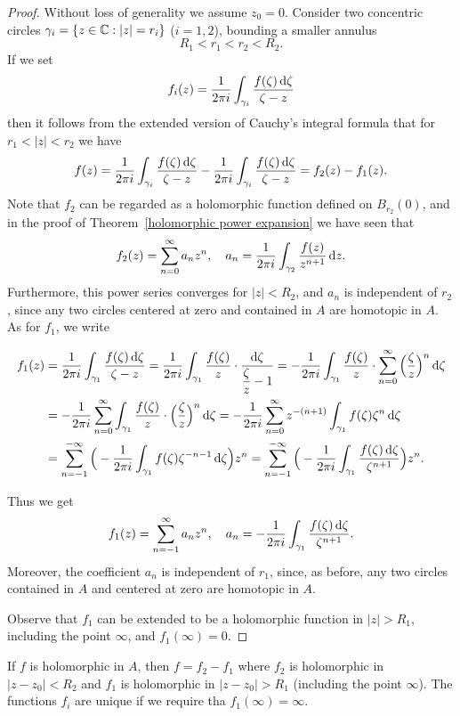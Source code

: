 \begin{proof}
Without loss of generality we assume $z_0=0$. Consider two concentric circles $\gamma_i=\{z\in\mathbb{C}:|z|=r_i\}$ ($i=1,2$), bounding a smaller annulus
\[R_1<r_1<r_2<R_2.\]
If we set
\[f_i(z)=\frac{1}{2\pi i}\int_{\gamma_i}\frac{f(\zeta)\mathop{}\!\mathrm{d}\zeta}{\zeta-z}\]
then it follows from the extended version of Cauchy's integral formula that for $r_1<|z|<r_2$ we have
\[f(z)=\frac{1}{2\pi i}\int_{\gamma_i}\frac{f(\zeta)\mathop{}\!\mathrm{d}\zeta}{\zeta-z}-\frac{1}{2\pi i}\int_{\gamma_i}\frac{f(\zeta)\mathop{}\!\mathrm{d}\zeta}{\zeta-z}=f_2(z)-f_1(z).\]
Note that $f_2$ can be regarded as a holomorphic function defined on $B_{r_2}(0)$, and in the proof of Theorem~\ref{holomorphic power expansion} we have seen that
\[f_2(z)=\sum_{n=0}^{\infty}a_nz^n,\quad a_n=\frac{1}{2\pi i}\int_{\gamma_2}\frac{f(z)}{z^{n+1}}\mathop{}\!\mathrm{d} z.\]
Furthermore, this power series converges for $|z|<R_2$, and $a_n$ is independent of $r_2$, since any two circles centered at zero and contained in $A$ are homotopic in $A$. As for $f_1$, we write
\begin{small}
\begin{align*}
f_1(z)&=\frac{1}{2\pi i}\int_{\gamma_1}\frac{f(\zeta)\mathop{}\!\mathrm{d}\zeta}{\zeta-z}=\frac{1}{2\pi i}\int_{\gamma_1}\frac{f(\zeta)}{z}\cdot\frac{\mathop{}\!\mathrm{d}\zeta}{\dfrac{\zeta}{z}-1}=-\frac{1}{2\pi i}\int_{\gamma_1}\frac{f(\zeta)}{z}\cdot\sum_{n=0}^{\infty}\Big(\frac{\zeta}{z}\Big)^n\mathop{}\!\mathrm{d}\zeta\\
&=-\frac{1}{2\pi i}\sum_{n=0}^{\infty}\int_{\gamma_1}\frac{f(\zeta)}{z}\cdot\Big(\frac{\zeta}{z}\Big)^n\mathop{}\!\mathrm{d}\zeta=-\frac{1}{2\pi i}\sum_{n=0}^{\infty}z^{-(n+1)}\int_{\gamma_1}f(\zeta)\zeta^n\mathop{}\!\mathrm{d}\zeta\\
&=\sum_{n=-1}^{-\infty}\Big(-\frac{1}{2\pi i}\int_{\gamma_1}f(\zeta)\zeta^{-n-1}\mathop{}\!\mathrm{d}\zeta\Big)z^{n}=\sum_{n=-1}^{-\infty}\Big(-\frac{1}{2\pi i}\int_{\gamma_1}\frac{f(\zeta)\mathop{}\!\mathrm{d}\zeta}{\zeta^{n+1}}\Big)z^{n}.
\end{align*}
\end{small}
Thus we get
\[f_1(z)=\sum_{n=-1}^{\infty}a_nz^n,\quad a_n=-\frac{1}{2\pi i}\int_{\gamma_1}\frac{f(\zeta)\mathop{}\!\mathrm{d}\zeta}{\zeta^{n+1}}.\]
Moreover, the coefficient $a_n$ is independent of $r_1$, since, as before, any two circles contained in $A$ and centered at zero are homotopic in $A$.\par
Observe that $f_1$ can be extended to be a holomorphic function in $|z|>R_1$, including the point $\infty$, and $f_1(\infty)=0$.
\end{proof}
\begin{corollary}
If $f$ is holomorphic in $A$, then $f=f_2-f_1$ where $f_2$ is holomorphic in $|z-z_0|<R_2$ and $f_1$ is holomorphic in $|z-z_0|>R_1$ (including the point $\infty$). The functions $f_i$ are unique if we require tha $f_1(\infty)=\infty$.
\end{corollary}
